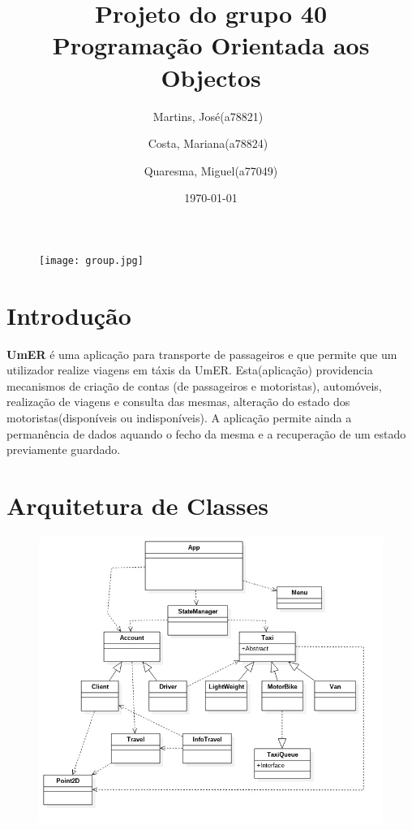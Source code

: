 \documentclass[a4paper,10pt,portuguese]{article}
\title{Projeto do grupo 40 \\ Programação Orientada aos Objectos}
\author{Martins, José(a78821)\
        \and
        Costa, Mariana(a78824)\
        \and
        Quaresma, Miguel(a77049)
        }
\date{\today}
\begin{document}
\begin{titlepage}
\maketitle
\begin{figure}
\centering
  \texttt{[image: group.jpg]}
\end{figure}
\end{titlepage}
 
\tableofcontents

\newpage

\section{Introdução}
\textbf{UmER} é uma aplicação para transporte de passageiros e que permite que um utilizador realize viagens em táxis da UmER. Esta(aplicação) providencia mecanismos de criação de contas (de passageiros e motoristas), automóveis, realização de viagens e consulta das mesmas, alteração do estado dos motoristas(disponíveis ou indisponíveis). A aplicação permite ainda a permanência de dados aquando o fecho da mesma e a recuperação de um estado previamente guardado.

\newpage

\section{Arquitetura de Classes}

\begin{figure}[!htb]
    \centering
        \includegraphics[width=120mm]{graph.jpg}
\end{figure}
\end{document}
